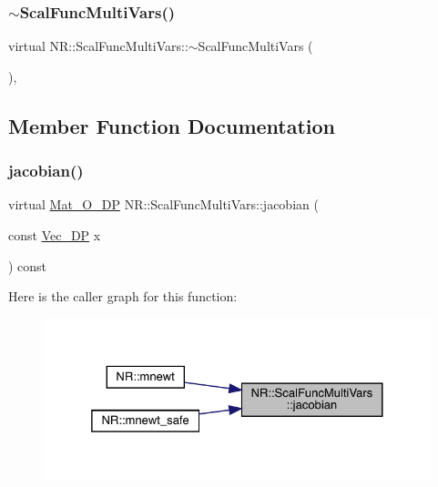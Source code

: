 \subsubsection{\texorpdfstring{$\sim$ScalFuncMultiVars()}{~ScalFuncMultiVars()}\hspace{0.1cm}{\footnotesize\ttfamily [3/3]}}
{\footnotesize\ttfamily virtual N\+R\+::\+Scal\+Func\+Multi\+Vars\+::$\sim$\+Scal\+Func\+Multi\+Vars (\begin{DoxyParamCaption}{ }\end{DoxyParamCaption})\hspace{0.3cm}{\ttfamily [inline]}, {\ttfamily [virtual]}}



\subsection{Member Function Documentation}
\mbox{\label{classNR_1_1ScalFuncMultiVars_ab8dd80ced0a7b26584bde4e34444c04a}} 
\subsubsection{\texorpdfstring{jacobian()}{jacobian()}\hspace{0.1cm}{\footnotesize\ttfamily [1/3]}}
{\footnotesize\ttfamily virtual \mbox{\hyperlink{namespaceNR_adc1f8da33094b6bbeb1f5f899515ce54}{Mat\+\_\+\+O\+\_\+\+DP}} N\+R\+::\+Scal\+Func\+Multi\+Vars\+::jacobian (\begin{DoxyParamCaption}\item[{const \mbox{\hyperlink{namespaceNR_a115a3196718c98e8e2562d80b06c23c5}{Vec\+\_\+\+DP}}}]{x }\end{DoxyParamCaption}) const\hspace{0.3cm}{\ttfamily [pure virtual]}}

Here is the caller graph for this function\+:
\nopagebreak
\begin{figure}[H]
\begin{center}
\leavevmode
\includegraphics[width=325pt]{d5/d17/classNR_1_1ScalFuncMultiVars_ab8dd80ced0a7b26584bde4e34444c04a_icgraph}
\end{center}
\end{figure}
\mbox{\label{classNR_1_1ScalFuncMultiVars_ab8dd80ced0a7b26584bde4e34444c04a}} 
